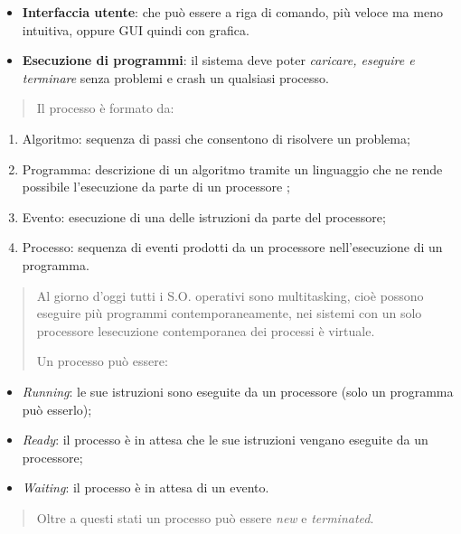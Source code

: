 \begin{itemize}
\item
  \textbf{Interfaccia utente}: che può essere a riga di comando, più
  veloce ma meno intuitiva, oppure GUI quindi con grafica.
\item
  \textbf{Esecuzione di programmi}: il sistema deve poter
  \emph{caricare, eseguire e terminare} senza problemi e crash un
  qualsiasi processo.
\end{itemize}

\begin{quote}
Il processo è formato da:
\end{quote}

\begin{enumerate}
\def\labelenumi{\arabic{enumi}.}
\item
  Algoritmo: sequenza di passi che consentono di risolvere un problema;
\item
  Programma: descrizione di un algoritmo tramite un linguaggio che ne
  rende possibile l'esecuzione da parte di un processore ;
\item
  Evento: esecuzione di una delle istruzioni da parte del processore;
\item
  Processo: sequenza di eventi prodotti da un processore nell'esecuzione
  di un programma.
\end{enumerate}

\begin{quote}
Al giorno d'oggi tutti i S.O. operativi sono multitasking, cioè possono
eseguire più programmi contemporaneamente, nei sistemi con un solo
processore l\textquotesingle esecuzione contemporanea dei processi è
virtuale.

Un processo può essere:
\end{quote}

\begin{itemize}
\item
  \emph{Running}: le sue istruzioni sono eseguite da un processore (solo
  un programma può esserlo);
\item
  \emph{Ready}: il processo è in attesa che le sue istruzioni vengano
  eseguite da un processore;
\item
  \emph{Waiting}: il processo è in attesa di un evento.
\end{itemize}

\begin{quote}
Oltre a questi stati un processo può essere \emph{new} e
\emph{terminated}.
\end{quote}

